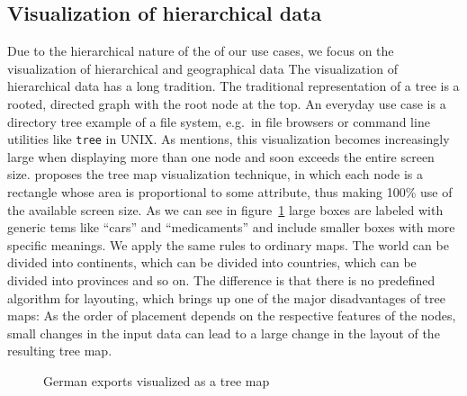 \documentclass{article}
\begin{document}
\subsection{Visualization of hierarchical data}
Due to the hierarchical nature of the of our use cases, we focus on the visualization of hierarchical and geographical data
The visualization of hierarchical data has a long tradition.
The traditional representation of a tree is a rooted, directed graph with the root node at the top.
An everyday use case is a directory tree example of a file system, e.g.\ in file browsers or command line utilities like \texttt{tree} in UNIX\@.
As \textcite{Shneiderman1992} mentions, this visualization becomes increasingly large when displaying more than one node and soon exceeds the entire screen size.
\textcite{Johnson1991} proposes the tree map visualization technique, in which each node is a rectangle whose area is proportional to some attribute, thus making 100\% use of the available screen size.
As we can see in figure~\ref{fig:research:treemap} large boxes are labeled with generic tems like ``cars'' and ``medicaments'' and include smaller boxes with more specific meanings.
We apply the same rules to ordinary maps.
The world can be divided into continents, which can be divided into countries, which can be divided into provinces and so on.
The difference is that there is no predefined algorithm for layouting, which brings up one of the major disadvantages of tree maps:
As the order of placement depends on the respective features of the nodes, small changes in the input data can lead to a large change in the layout of the resulting tree map.

\begin{figure}[h]
  \centering
   \caption{German exports visualized as a tree map}
  \label{fig:research:treemap}
\end{figure}
\end{document}
